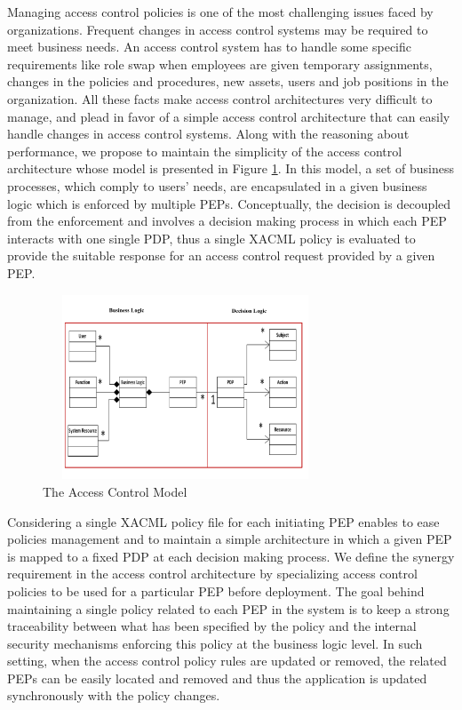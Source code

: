 Managing access control policies is one of the most challenging issues faced by organizations. 
Frequent changes in access control systems may be required to meet business needs. An access control system has to handle some specific 
requirements like role swap when employees are given temporary assignments, changes in the policies and procedures, 
new assets, users and job positions in the organization.
All these facts make access control architectures very difficult to manage, and plead in favor of a 
simple access control architecture that can easily handle changes in access control systems. 
Along with the reasoning about performance, we propose to maintain the simplicity of the access control architecture whose model 
is presented in Figure \ref{model}. In this model, a set of business processes, which comply to users' needs, are encapsulated in a given business logic 
which is enforced by multiple PEPs. Conceptually, the decision is decoupled from the enforcement and involves a decision making process in which each PEP 
interacts 
with one single PDP, thus a single XACML policy is evaluated to provide the suitable response for an access control request provided by a given PEP. 
\begin{figure}[!h]
\begin{center}
\includegraphics[height=5.5cm,width=8.5cm]{model}
\caption{The Access Control Model}
\label{model}
\end{center}
\end{figure}

Considering a single XACML policy file for each initiating PEP enables to ease policies management and to maintain a simple architecture 
in which a given PEP is mapped to a fixed PDP at each decision making process. We define the synergy requirement in the access control 
architecture by specializing access control policies to be used for a particular PEP before deployment. The goal behind maintaining a single 
policy related to each PEP in the system is to keep a strong traceability between what has been specified by the policy and the internal 
security mechanisms enforcing this policy at the business logic level. In such setting, when the access control policy rules are updated or removed, 
the related PEPs can be easily located and removed and thus the application is updated synchronously with the policy changes. 

